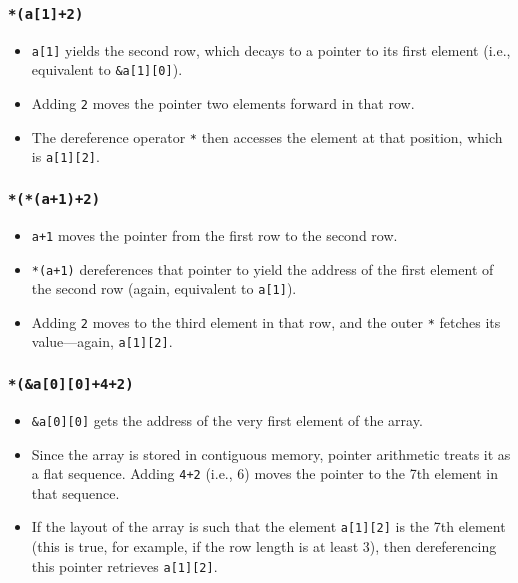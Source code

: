\documentclass[a4paper, 10pt]{article}
\begin{document}
\subsubsection*{\texttt{*(a[1]+2)}}
\begin{itemize}
    \item \texttt{a[1]} yields the second row, which decays to a pointer to its first element (i.e., equivalent to \texttt{\&a[1][0]}).
    \item Adding \texttt{2} moves the pointer two elements forward in that row.
    \item The dereference operator \texttt{*} then accesses the element at that position, which is \texttt{a[1][2]}.
\end{itemize}

\subsubsection*{\texttt{*(*(a+1)+2)}}
\begin{itemize}
    \item \texttt{a+1} moves the pointer from the first row to the second row.
    \item \texttt{*(a+1)} dereferences that pointer to yield the address of the first element of the second row (again, equivalent to \texttt{a[1]}).
    \item Adding \texttt{2} moves to the third element in that row, and the outer \texttt{*} fetches its value---again, \texttt{a[1][2]}.
\end{itemize}

\subsubsection*{\texttt{*(\&a[0][0]+4+2)}}
\begin{itemize}
    \item \texttt{\&a[0][0]} gets the address of the very first element of the array.
    \item Since the array is stored in contiguous memory, pointer arithmetic treats it as a flat sequence. Adding \texttt{4+2} (i.e., 6) moves the pointer to the 7th element in that sequence.
    \item If the layout of the array is such that the element \texttt{a[1][2]} is the 7th element (this is true, for example, if the row length is at least 3), then dereferencing this pointer retrieves \texttt{a[1][2]}.
\end{itemize}
\end{document}
